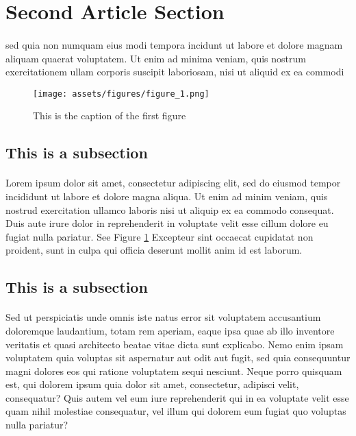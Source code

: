 
\section{Second Article Section}
    \paragraph{}
    sed quia non numquam eius modi tempora incidunt ut labore et dolore magnam aliquam quaerat voluptatem. Ut enim ad minima
    veniam, quis nostrum exercitationem ullam corporis suscipit laboriosam, nisi ut aliquid ex ea commodi

    \begin{figure}[!ht]
        \centering
        \texttt{[image: assets/figures/figure\_1.png]}
        \caption{This is the caption of the first figure}
        \label{fig:figure of something}
    \end{figure}
    
    \subsection{This is a subsection}
    \paragraph{}
    Lorem ipsum dolor sit amet, consectetur adipiscing elit, sed do eiusmod tempor incididunt ut labore et dolore magna aliqua.
    Ut enim ad minim veniam, quis nostrud exercitation ullamco laboris nisi ut aliquip ex ea commodo consequat. Duis aute irure
    dolor in reprehenderit in voluptate velit esse cillum dolore eu fugiat nulla pariatur. See Figure \ref{fig:figure of something}
    Excepteur sint occaecat cupidatat non proident, sunt in culpa qui officia deserunt mollit anim id est laborum.

    \subsection{This is a subsection}
    \paragraph{}
    Sed ut perspiciatis unde omnis iste natus error sit voluptatem accusantium doloremque laudantium, totam rem aperiam,
    eaque ipsa quae ab illo inventore veritatis et quasi architecto beatae vitae dicta sunt explicabo. Nemo enim ipsam
    voluptatem quia voluptas sit aspernatur aut odit aut fugit, sed quia consequuntur magni dolores eos qui ratione
    voluptatem sequi nesciunt. Neque porro quisquam est, qui dolorem ipsum quia dolor sit amet, consectetur, adipisci
    velit, consequatur? Quis autem vel eum iure reprehenderit qui in ea voluptate velit esse quam nihil molestiae
    consequatur, vel illum qui dolorem eum fugiat quo voluptas nulla pariatur?

